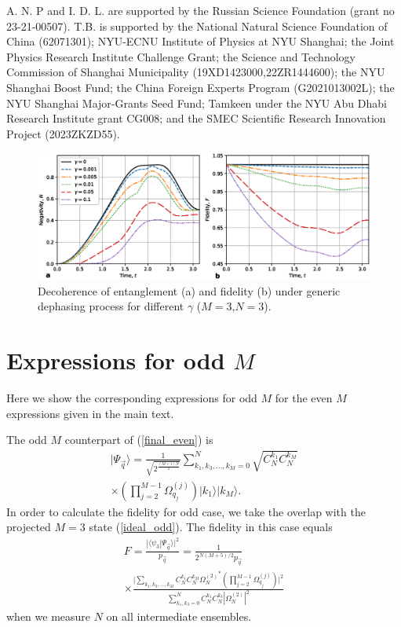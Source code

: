 \documentclass[%
  prx,%
  twocolumn,%
  preprintnumbers,%
  amsmath,%
  amssymb,%
  superscriptaddress%
]{revtex4}
\begin{document}
{A. N. P and I. D. L.  are supported by the Russian Science Foundation (grant no 23-21-00507). T.B. is supported by the National Natural Science Foundation of China (62071301); NYU-ECNU Institute of Physics at NYU Shanghai;  the Joint Physics Research Institute Challenge Grant; the Science and Technology Commission of Shanghai Municipality (19XD1423000,22ZR1444600); the NYU Shanghai Boost Fund; the China Foreign Experts Program (G2021013002L); the NYU Shanghai Major-Grants Seed Fund; Tamkeen under the NYU Abu Dhabi Research Institute grant CG008; and the SMEC Scientific Research Innovation Project (2023ZKZD55).



\begin{figure}[t]
    \centering
    \includegraphics[width=1.85\columnwidth]{negativity-fidelity-decoherence-low-m3-n3.eps}
    \caption{Decoherence of entanglement (a) and fidelity (b) under generic dephasing process for different $\gamma$ ($M=3$,$N=3$).
    }
    \label{decoherence}
\end{figure}



\appendix

\section{Expressions for odd $ M $}
\label{sec:oddMexpressions}

Here we show the corresponding expressions for odd $ M $ for the even $ M $ expressions given in the main text.

The odd $ M $ counterpart of (\ref{final_even}) is
%
\begin{multline}
\label{final_odd}
| \Psi_{\vec{q}} \rangle=\frac{1}{\sqrt{2^{\frac{(M+1)N}{2}}}}\sum_{k_1,k_3,\ldots,k_M=0}^{N} \sqrt{ C^{k_1}_{N}  C^{k_M}_{N} }
 \\ \times \left( \prod_{j=2}^{M-1} \Omega_{q_j}^{(j)} \right) |k_1\rangle|k_M\rangle .
\end{multline}
%
In order to calculate the fidelity for odd case, we take the overlap with the projected $ M = 3 $ state (\ref{ideal_odd}). The fidelity in this case equals
%
\begin{multline}
\label{fidelity_odd}
F = \frac{| \langle  \psi_3 | \Psi_{\vec{q}} \rangle |^2}{p_{\vec{q}} }   =\frac{1}{2^{N(M+5)/2} p_{\vec{q}} }\\
\times \frac{\Big|\sum_{k_1, k_3, \dots, k_M }
 C_N^{k_1}C_N^{k_M} {\Omega_{N}^{(2)}}^* \left( \prod_{j=2}^{M-1} \Omega_{q_j}^{(j)} \right)   \Big|^2 }{ \sum_{k_1,k_3=0}^{N}  C^{k_1}_{N}  C^{k_3}_{N} | \Omega_{N}^{(2)} |^2 }
\end{multline}
%
when we measure $N$ on all  intermediate ensembles.

}
\end{document}
